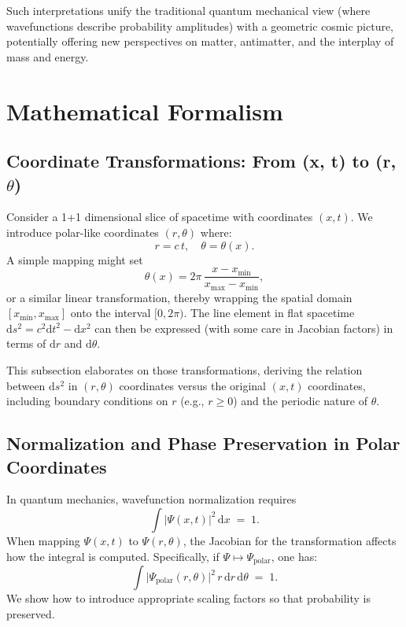 \documentclass[11pt]{article}
\begin{document}
Such interpretations unify the traditional quantum mechanical view (where wavefunctions 
describe probability amplitudes) with a geometric cosmic picture, potentially offering 
new perspectives on matter, antimatter, and the interplay of mass and energy.

\section{Mathematical Formalism}
\label{sec:math-formalism}

\subsection{Coordinate Transformations: From (x, t) to (r, \texorpdfstring{\(\theta\)}{theta})}
\label{subsec:coord-transform}
Consider a 1+1 dimensional slice of spacetime with coordinates \((x, t)\). 
We introduce polar-like coordinates \((r, \theta)\) where:
\[
  r = c \, t, 
  \quad
  \theta = \theta(x).
\]
A simple mapping might set
\[
  \theta(x) = 2\pi \, \frac{x - x_{\mathrm{min}}}{x_{\mathrm{max}} - x_{\mathrm{min}}}, 
\]
or a similar linear transformation, thereby wrapping the spatial domain 
\([x_{\mathrm{min}}, x_{\mathrm{max}}]\) onto the interval \([0, 2\pi)\). 
The line element in flat spacetime 
\(\mathrm{d}s^2 = c^2 \mathrm{d}t^2 - \mathrm{d}x^2\)
can then be expressed (with some care in Jacobian factors) in terms of 
\(\mathrm{d}r\) and \(\mathrm{d}\theta\). 

This subsection elaborates on those transformations, deriving the 
relation between \(\mathrm{d}s^2\) in \((r, \theta)\) coordinates 
versus the original \((x, t)\) coordinates, including boundary conditions 
on \(r\) (e.g., \(r \ge 0\)) and the periodic nature of \(\theta\).

\subsection{Normalization and Phase Preservation in Polar Coordinates}
\label{subsec:normalization}
In quantum mechanics, wavefunction normalization requires
\[
  \int \lvert \Psi(x,t) \rvert^2 \,\mathrm{d}x \;=\; 1.
\]
When mapping \(\Psi(x,t)\) to \(\Psi(r,\theta)\), the Jacobian for 
the transformation affects how the integral is computed. Specifically, 
if \(\Psi\mapsto\Psi_{\mathrm{polar}}\), one has:
\[
  \int \lvert \Psi_{\mathrm{polar}}(r,\theta) \rvert^2 \, r \,\mathrm{d}r \,\mathrm{d}\theta \;=\; 1.
\]
We show how to introduce appropriate scaling factors so that probability 
is preserved. 
\end{document}
